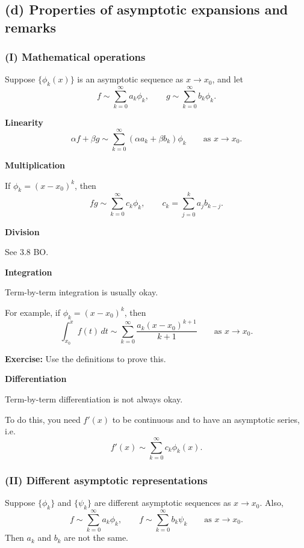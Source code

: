 \documentclass[11pt,a4paper]{article}
\begin{document}
\subsection*{(d) Properties of asymptotic expansions and remarks}

\subsubsection*{(I) Mathematical operations}

Suppose \(\{\phi_k(x)\}\) is an asymptotic sequence as \(x \to x_0\), and let
\[
f \sim \sum_{k=0}^{\infty} a_k \phi_k,
\qquad
g \sim \sum_{k=0}^{\infty} b_k \phi_k.
\]

\noindent
\textbf{Linearity}
\[
\alpha f + \beta g
\sim \sum_{k=0}^{\infty} (\alpha a_k + \beta b_k)\phi_k
\qquad \text{as } x \to x_0.
\]

\noindent
\textbf{Multiplication}

If \(\phi_k = (x-x_0)^k\), then
\[
fg \sim \sum_{k=0}^{\infty} c_k \phi_k,
\qquad
c_k = \sum_{j=0}^{k} a_j b_{k-j}.
\]

\noindent
\textbf{Division}

See 3.8 BO.

\medskip
\noindent
\textbf{Integration}

Term-by-term integration is usually okay.

For example, if \(\phi_k = (x-x_0)^k\), then
\[
\int_{x_0}^{x} f(t)\,dt
\sim \sum_{k=0}^{\infty}
\frac{a_k(x-x_0)^{k+1}}{k+1}
\qquad \text{as } x \to x_0.
\]

\noindent
\textbf{Exercise:} Use the definitions to prove this.

\medskip
\noindent
\textbf{Differentiation}

Term-by-term differentiation is not always okay.

To do this, you need \(f'(x)\) to be continuous and to have an
asymptotic series, i.e.
\[
f'(x) \sim \sum_{k=0}^{\infty} c_k \phi_k(x).
\]

\subsubsection*{(II) Different asymptotic representations}

Suppose \(\{\phi_k\}\) and \(\{\psi_k\}\) are different asymptotic
sequences as \(x \to x_0\). Also,
\[
f \sim \sum_{k=0}^{\infty} a_k \phi_k,
\qquad
f \sim \sum_{k=0}^{\infty} b_k \psi_k
\qquad \text{as } x \to x_0.
\]
Then \(a_k\) and \(b_k\) are not the same.
\end{document}
